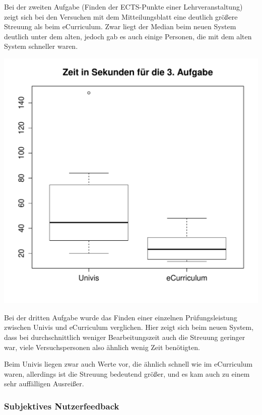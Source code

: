 \documentclass[a4paper,10pt]{scrartcl}
\begin{document}
Bei der zweiten Aufgabe (Finden der ECTS-Punkte einer Lehrveranstaltung) zeigt sich bei den Versuchen mit dem Mitteilungsblatt eine deutlich größere Streuung als beim eCurriculum. Zwar liegt der Median beim neuen System deutlich unter dem alten, jedoch gab es auch einige Personen, die mit dem alten System schneller waren.

\begin{center}
 \includegraphics[width=\linewidth]{./Appendix/Plots/Boxplots/a3_boxplot.pdf}
\end{center}

Bei der dritten Aufgabe wurde das Finden einer einzelnen Prüfungsleistung zwischen Univis und eCurriculum verglichen. Hier zeigt sich beim neuen System, dass bei durchschnittlich weniger Bearbeitungszeit auch die Streuung geringer war, viele Versuchspersonen also ähnlich wenig Zeit benötigten.

Beim Univis liegen zwar auch Werte vor, die ähnlich schnell wie im eCurriculum waren, allerdings ist die Streuung bedeutend größer, und es kam auch zu einem sehr auffälligen Ausreißer.

\pagebreak

\subsubsection*{Subjektives Nutzerfeedback}
\end{document}
